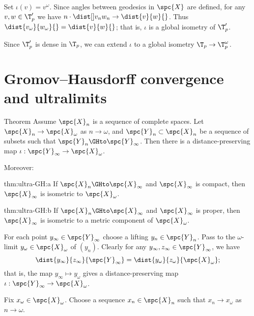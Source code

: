 Set $\iota(v)=v^\omega$.
Since angles between geodesics in $\spc{X}$ are defined, for any $v,w\in \T_p'$ we have
$n\cdot\dist[{{}}]{v_n}{w_n}{}\to\dist{v}{w}{}$.
Thus $\dist{v_\omega}{w_\omega}{}=\dist{v}{w}{}$; that is, $\iota$ is a global isometry of $\T_p'$.

Since $\T_p'$ is dense in $\T_p$,
we can extend $\iota$ to a global isometry $\T_p\to \T^\omega_p$.
\qeds

{\sloppy

\section[Gromov--Hausdorff and ultralimits]{Gromov--Hausdorff convergence and ultralimits}

}

\begin{thm}{Theorem}\label{thm:ultra-GH}
Assume $\spc{X}_n$ is a sequence of complete spaces. 
Let $\spc{X}_n\to \spc{X}_\omega$ as $n\to\omega$,
and $\spc{Y}_n\subset \spc{X}_n$ 
be a sequence of subsets such that $\spc{Y}_n\GHto\spc{Y}_\infty$. 
Then there is a distance-preserving map 
$\iota:\spc{Y}_\infty\to \spc{X}_\omega$.

Moreover:

\begin{subthm}{thm:ultra-GH:a}
If $\spc{X}_n\GHto \spc{X}_\infty$ 
and $\spc{X}_\infty$ is compact, then 
$\spc{X}_\infty$ is isometric to $\spc{X}_\omega$.
\end{subthm}

\begin{subthm}{thm:ultra-GH:b}
If $\spc{X}_n\GHto \spc{X}_\infty$ 
and $\spc{X}_\infty$ is proper, then 
$\spc{X}_\infty$ is isometric to a metric component of $\spc{X}_\omega$.
\end{subthm}

\end{thm}

For each point $y_\infty\in \spc{Y}_\infty$ 
choose a lifting $y_n\in \spc{Y}_n$.
Pass to the $\omega$-limit $y_\omega\in \spc{X}_\omega$ of $(y_n)$.
Clearly for any $y_\infty,z_\infty\in \spc{Y}_\infty$, 
we have 
\[\dist{y_\infty}{z_\infty}{\spc{Y}_\infty}=\dist{y_\omega}{z_\omega}{\spc{X}_\omega};\] 
that is, the map $y_\infty\mapsto y_\omega$ gives a distance-preserving map $\iota:\spc{Y}_\infty\to \spc{X}_\omega$. 


Fix $x_\omega\in \spc{X}_\omega$.
Choose a sequence $x_n\in \spc{X}_n$ 
such that $x_n\to x_\omega$ as $n\to\omega$. 

